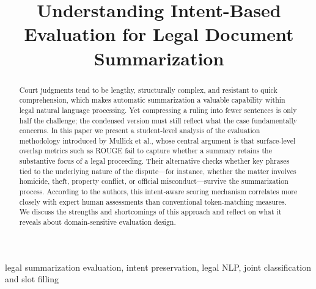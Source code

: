 \documentclass[conference]{IEEEtran}
\begin{document}
\title{Understanding Intent-Based Evaluation for Legal Document Summarization}

\author{
\and
{}
\and
{}
}

\maketitle

\begin{abstract}
Court judgments tend to be lengthy, structurally complex, and resistant to quick comprehension, which makes automatic summarization a valuable capability within legal natural language processing. Yet compressing a ruling into fewer sentences is only half the challenge; the condensed version must still reflect what the case fundamentally concerns. In this paper we present a student-level analysis of the evaluation methodology introduced by Mullick et al., whose central argument is that surface-level overlap metrics such as ROUGE fail to capture whether a summary retains the substantive focus of a legal proceeding. Their alternative checks whether key phrases tied to the underlying nature of the dispute---for instance, whether the matter involves homicide, theft, property conflict, or official misconduct---survive the summarization process. According to the authors, this intent-aware scoring mechanism correlates more closely with expert human assessments than conventional token-matching measures. We discuss the strengths and shortcomings of this approach and reflect on what it reveals about domain-sensitive evaluation design.
\end{abstract}

\begin{IEEEkeywords}
legal summarization evaluation, intent preservation, legal NLP, joint classification and slot filling
\end{IEEEkeywords}
\end{document}
